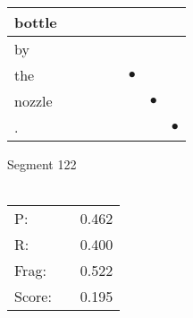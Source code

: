 \documentclass[landscape]{article}
\newcommand{\ssp}{\hspace{2pt}}
\newcommand{\mex}{\cellcolor{g}$\bullet$}
\begin{document}
\begin{tabular}{|l|p{10pt}|p{10pt}|p{10pt}|p{10pt}|p{10pt}|p{10pt}|p{10pt}|}
\hline
\ssp bottle \ssp&\hspace{2pt}&\hspace{2pt}&\hspace{2pt}&\hspace{2pt}&\hspace{2pt}&\hspace{2pt}&\hspace{2pt}\\
\hline
\ssp by \ssp&\hspace{2pt}&\hspace{2pt}&\hspace{2pt}&\hspace{2pt}&\hspace{2pt}&\hspace{2pt}&\hspace{2pt}\\
\hline
\ssp \cellcolor{ref4}the \ssp&\hspace{2pt}&\hspace{2pt}&\hspace{2pt}&\hspace{2pt}&\hspace{2pt}\mex&\hspace{2pt}&\hspace{2pt}\\
\hline
\ssp \cellcolor{ref5}nozzle \ssp&\hspace{2pt}&\hspace{2pt}&\hspace{2pt}&\hspace{2pt}&\hspace{2pt}&\hspace{2pt}\mex&\hspace{2pt}\\
\hline
\ssp \cellcolor{ref6}. \ssp&\hspace{2pt}&\hspace{2pt}&\hspace{2pt}&\hspace{2pt}&\hspace{2pt}&\hspace{2pt}&\hspace{2pt}\mex\\
\hline
\end{tabular}

\vspace{6pt}
\noindent Segment 122\\\\
\noindent\begin{tabular}{lm{12pt}r}
\hline
P:&&0.462\\
R:&&0.400\\
Frag:&&0.522\\
Score:&&0.195\\
\end{tabular}
\end{document}
